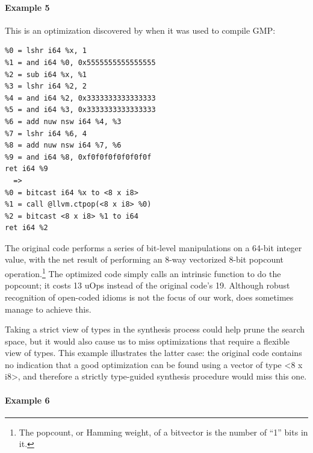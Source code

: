 \paragraph*{Example 5}

This is an optimization discovered
by \minotaur{} when it was used to compile GMP:


{\begin{quoting}\begin{Verbatim}
%0 = lshr i64 %x, 1
%1 = and i64 %0, 0x5555555555555555
%2 = sub i64 %x, %1
%3 = lshr i64 %2, 2
%4 = and i64 %2, 0x3333333333333333
%5 = and i64 %3, 0x3333333333333333
%6 = add nuw nsw i64 %4, %3
%7 = lshr i64 %6, 4
%8 = add nuw nsw i64 %7, %6
%9 = and i64 %8, 0xf0f0f0f0f0f0f0f
ret i64 %9
  =>
%0 = bitcast i64 %x to <8 x i8>
%1 = call @llvm.ctpop(<8 x i8> %0)
%2 = bitcast <8 x i8> %1 to i64
ret i64 %2
\end{Verbatim}
\end{quoting}}

%
%
The original code performs a series of bit-level
manipulations on a 64-bit integer value, with the net result of
performing an 8-way vectorized 8-bit popcount operation.\footnote{The
popcount, or Hamming weight, of a bitvector is the number of ``1''
bits in it.}
%
The optimized code simply calls an intrinsic function to do the
popcount; it costs 13 uOps instead of the original code's 19.
%
Although robust recognition of open-coded idioms is not the focus
of our work, \minotaur{} does sometimes manage to achieve this.

Taking a strict view of types in the synthesis process could help
prune the search space, but it would also cause us to miss
optimizations that require a flexible view of types.
%
This example illustrates the latter case: the original code contains
no indication that a good optimization can be found using a vector of
type <8 x i8>, and therefore a strictly type-guided synthesis
procedure would miss this one.

\paragraph*{Example 6}

